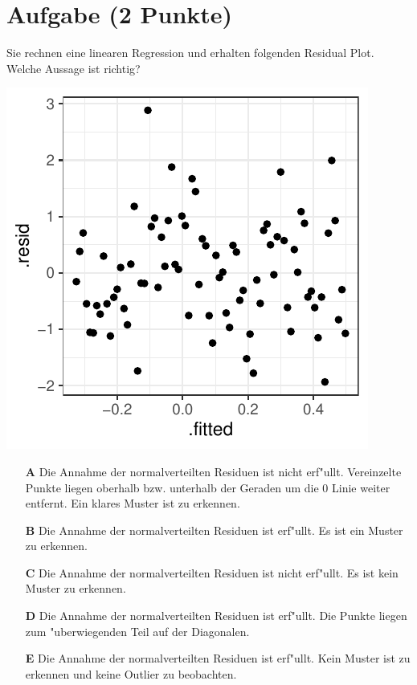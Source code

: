 \documentclass[a4paper, 10pt]{scrartcl}\usepackage[]{graphicx}\usepackage[]{xcolor}
\makeatletter
\def\maxwidth{ %
  \ifdim\Gin@nat@width>\linewidth
    \linewidth
  \else
    \Gin@nat@width
  \fi
}
\makeatother
\begin{document}
\section{Aufgabe \hfill (2 Punkte)}

Sie rechnen eine linearen Regression und erhalten folgenden Residual
Plot. Welche Aussage ist richtig?




{\centering \includegraphics[width=\maxwidth]{img/mc-regression-06-a-1} 

}







\begin{enumerate}
\item [\textbf{A} \msquare] Die Annahme der normalverteilten Residuen ist nicht erf{"u}llt. Vereinzelte Punkte liegen oberhalb bzw. unterhalb der Geraden um die 0 Linie weiter entfernt. Ein klares Muster ist zu erkennen.
\item [\textbf{B} \msquare] Die Annahme der normalverteilten Residuen ist erf{"u}llt. Es ist ein Muster zu erkennen.
\item [\textbf{C} \msquare] Die Annahme der normalverteilten Residuen ist nicht erf{"u}llt. Es ist kein Muster zu erkennen.
\item [\textbf{D} \msquare] Die Annahme der normalverteilten Residuen ist erf{"u}llt. Die Punkte liegen zum {"u}berwiegenden Teil auf der Diagonalen.
\item [\textbf{E} \msquare] Die Annahme der normalverteilten Residuen ist erf{"u}llt. Kein Muster ist zu erkennen und keine Outlier zu beobachten.
\end{enumerate}
\end{document}
